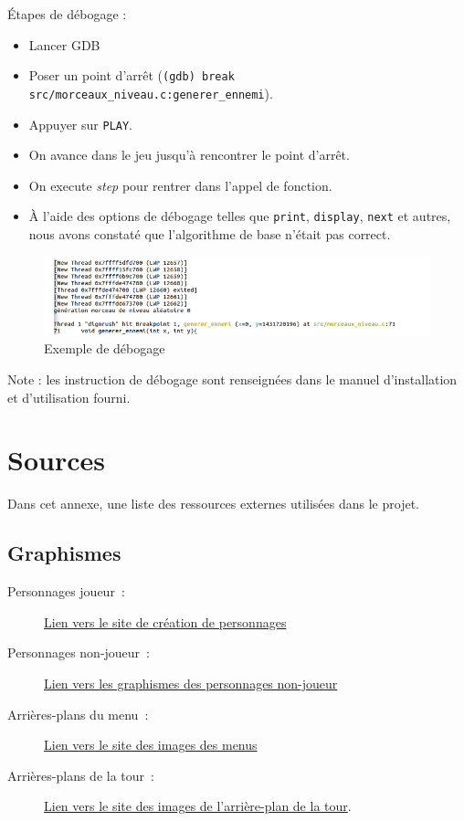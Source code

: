 \documentclass[a4paper,12pt]{article}
\begin{document}
\begin{appendices}
Étapes de débogage : 
\begin{itemize}
	\item Lancer GDB
	\item Poser un point d'arrêt (\texttt{(gdb) break src/morceaux\_niveau.c:generer\_ennemi}).
	\item Appuyer sur \texttt{PLAY}.
	\item On avance dans le jeu jusqu'à rencontrer le point d'arrêt.
	\item On execute \textit{step} pour rentrer dans l'appel de fonction.
	\item À l'aide des options de débogage telles que \texttt{print}, \texttt{display}, \texttt{next} et autres, nous avons constaté que l'algorithme de base n'était pas correct.
\end{itemize}
\begin{figure}[H]
	\centering
	\includegraphics[width=\textwidth]{img/debug.png}
	\caption{Exemple de débogage}
	\label{débogage}
\end{figure}
Note : les instruction de débogage sont renseignées dans le manuel d'installation et d'utilisation fourni. \\

\section{Sources}

Dans cet annexe, une liste des ressources externes utilisées dans le projet.

\subsection{Graphismes}
\begin{description}
	\item[Personnages joueur :] \href{https://sanderfrenken.github.io/Universal-LPC-Spritesheet-Character-Generator/#?body=Body_color_light&head=Human_male_light}{Lien vers le site de création de personnages}
	\item[Personnages non-joueur :] \href{https://craftpix.net/freebies/free-fantasy-enemies-pixel-art-sprite-pack/}{Lien vers les graphismes des personnages non-joueur}
	\item[Arrières-plans du menu :] \href{https://fr.freepik.com/psd-gratuit/rendu-3d-illustration-chambre-royale_38612904.htm#query=jeux\%202d\%20medievale&position=3&from_view=keyword&track=ais&uuid=be1b354a-483d-48a5-867b-e3027182dea7}{Lien vers le site des images des menus}
	\item[Arrières-plans de la tour :] \href{https://free-game-assets.itch.io/free-sky-with-clouds-background-pixel-art-set}{Lien vers le site des images de l'arrière-plan de la tour}.
\end{description}


\end{appendices}
\end{document}
